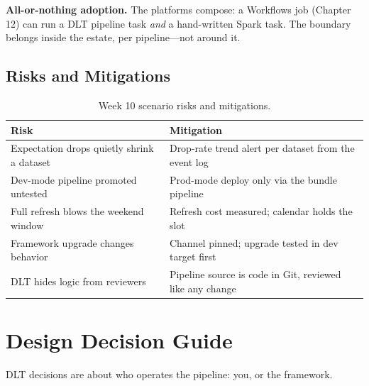 \begin{pitfall}
\textbf{All-or-nothing adoption.} The platforms compose: a Workflows job (Chapter 12) can run a DLT pipeline task \emph{and} a hand-written Spark task. The boundary belongs inside the estate, per pipeline---not around it.
\end{pitfall}

\subsection{Risks and Mitigations}
\begin{table}[H]
\centering
\small
\begin{tabular}{@{}p{4.6cm}p{7.6cm}@{}}
\toprule
\textbf{Risk} & \textbf{Mitigation} \\
\midrule
Expectation drops quietly shrink a dataset & Drop-rate trend alert per dataset from the event log \\
Dev-mode pipeline promoted untested & Prod-mode deploy only via the bundle pipeline \\
Full refresh blows the weekend window & Refresh cost measured; calendar holds the slot \\
Framework upgrade changes behavior & Channel pinned; upgrade tested in dev target first \\
DLT hides logic from reviewers & Pipeline source is code in Git, reviewed like any change \\
\bottomrule
\end{tabular}
\caption{Week 10 scenario risks and mitigations.}
\label{tab:ch10-risks}
\end{table}

\section{Design Decision Guide}
%
DLT decisions are about who operates the pipeline: you, or the framework.

